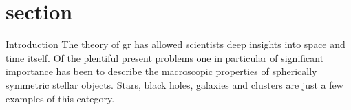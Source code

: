 \section{section}{Introduction}
\label{sec:01-Intro}
The theory of \ac{gr} has allowed scientists deep insights into space and time itself.
Of the plentiful present problems one in particular of significant importance has been to describe the macroscopic properties of spherically symmetric stellar objects.
Stars, black holes, galaxies and clusters are just a few examples of this category.


